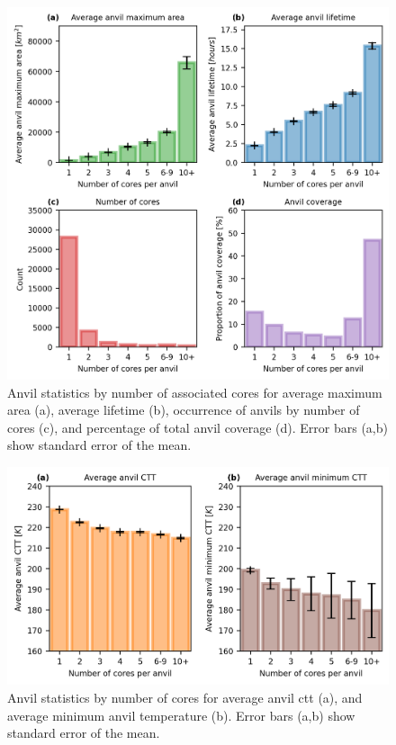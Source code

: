 \begin{figure}[t]
    \includegraphics[width=\textwidth]{figures/ch3_06.png}
    \caption[
    Anvil statistics by number of associated cores for average maximum area, average lifetime, occurrence of anvils by number of cores, and percentage of total anvil coverage
    ]{
    Anvil statistics by number of associated cores for average maximum area (a), average lifetime (b), occurrence of anvils by number of cores (c), and percentage of total anvil coverage (d). Error bars (a,b) show standard error of the mean.
    }
    \label{fig:seviri_anvil_stats}
\end{figure}


\begin{figure}[t]
    \includegraphics[width=\textwidth]{figures/ch3_07.png}
    \caption[
    Anvil statistics by number of cores for average anvil \acrshort{ctt} and average minimum anvil temperature
    ]{
    Anvil statistics by number of cores for average anvil \acrshort{ctt} (a), and average minimum anvil temperature (b). Error bars (a,b) show standard error of the mean.
    }
    \label{fig:seviri_anvil_ctt_stats}
\end{figure}


